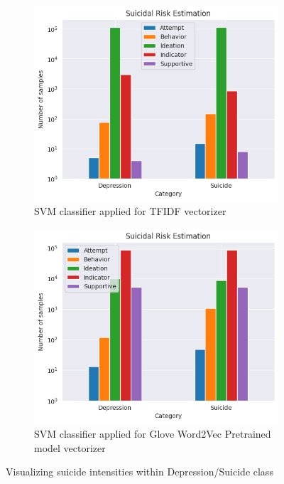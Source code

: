 \documentclass[sn-mathphys,Numbered]{sn-jnl}%
\theoremstyle{thmstyleone}%
\theoremstyle{thmstyletwo}%
\theoremstyle{thmstylethree}%
\begin{document}
\begin{figure}[H]
\centering
\begin{subfigure}{0.45\textwidth}
    \includegraphics[width=\textwidth]{grid_svm.png}
    \caption{SVM classifier applied for TFIDF vectorizer}
    \label{SVMTFIDF}
\end{subfigure}
\hfill
\begin{subfigure}{0.45\textwidth}
    \includegraphics[width=\textwidth]{glove_vec.png}
    \caption{SVM classifier applied for Glove Word2Vec Pretrained model vectorizer}
    \label{GloveWord2Vec}
\end{subfigure}        
\caption{Visualizing suicide intensities within Depression/Suicide class}
\label{Suicidal_int_vis} 
\end{figure}
\end{document}
